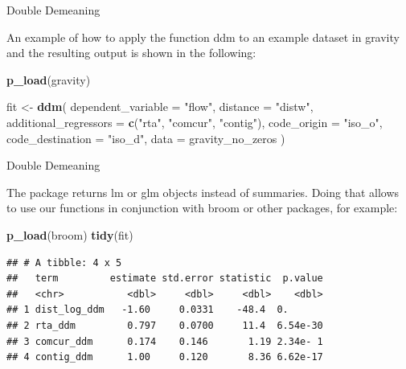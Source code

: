 \documentclass[ignorenonframetext,compress,aspectratio=169]{beamer}
\newenvironment{Shaded}{\begin{snugshade}}{\end{snugshade}}
\newcommand{\KeywordTok}[1]{\textcolor[rgb]{0.13,0.29,0.53}{\textbf{#1}}}
\newcommand{\DataTypeTok}[1]{\textcolor[rgb]{0.13,0.29,0.53}{#1}}
\newcommand{\StringTok}[1]{\textcolor[rgb]{0.31,0.60,0.02}{#1}}
\newcommand{\NormalTok}[1]{#1}
\begin{document}
\begin{frame}[fragile]{Double Demeaning}

An example of how to apply the function ddm to an example dataset in
gravity and the resulting output is shown in the following:

\begin{Shaded}
\begin{Highlighting}[]
\KeywordTok{p_load}\NormalTok{(gravity)}

\NormalTok{fit <-}\StringTok{ }\KeywordTok{ddm}\NormalTok{(}
    \DataTypeTok{dependent_variable =} \StringTok{"flow"}\NormalTok{,}
    \DataTypeTok{distance =} \StringTok{"distw"}\NormalTok{,}
    \DataTypeTok{additional_regressors =} \KeywordTok{c}\NormalTok{(}\StringTok{"rta"}\NormalTok{, }\StringTok{"comcur"}\NormalTok{, }\StringTok{"contig"}\NormalTok{),}
    \DataTypeTok{code_origin =} \StringTok{"iso_o"}\NormalTok{,}
    \DataTypeTok{code_destination =} \StringTok{"iso_d"}\NormalTok{,}
    \DataTypeTok{data =}\NormalTok{ gravity_no_zeros}
\NormalTok{  )}
\end{Highlighting}
\end{Shaded}

\end{frame}

\begin{frame}[fragile]{Double Demeaning}

The package returns lm or glm objects instead of summaries. Doing that
allows to use our functions in conjunction with broom or other packages,
for example:

\begin{Shaded}
\begin{Highlighting}[]
\KeywordTok{p_load}\NormalTok{(broom)}
\KeywordTok{tidy}\NormalTok{(fit)}
\end{Highlighting}
\end{Shaded}

\begin{verbatim}
## # A tibble: 4 x 5
##   term         estimate std.error statistic  p.value
##   <chr>           <dbl>     <dbl>     <dbl>    <dbl>
## 1 dist_log_ddm   -1.60     0.0331    -48.4  0.      
## 2 rta_ddm         0.797    0.0700     11.4  6.54e-30
## 3 comcur_ddm      0.174    0.146       1.19 2.34e- 1
## 4 contig_ddm      1.00     0.120       8.36 6.62e-17
\end{verbatim}

\end{frame}
\end{document}
